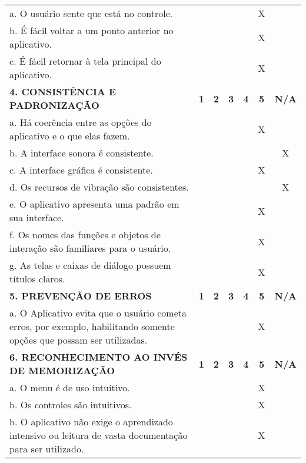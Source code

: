 \documentclass[portuguese,oneside]{tcc}
\begin{document}
\begin{center}
\begin{longtabu}{|L{25em}|c|c|c|c|c|c|}
																											a. O usuário sente que está no controle. & & & & & X & \\ 
																											b. É fácil voltar a um ponto anterior no aplicativo. & & & & & X & \\ 
																											c. É fácil retornar à tela principal do aplicativo. & & & & & X & \\ 
																											\textbf{4. CONSISTÊNCIA E PADRONIZAÇÃO} & \textbf{1} & \textbf{2} & \textbf{3} & \textbf{4} & \textbf{5} & \textbf{N/A} \\ 
																											a. Há coerência entre as opções do aplicativo e o que elas fazem. & & & & & X & \\ 
																											b. A interface sonora é consistente. & & & & & & X \\ 
																											c. A interface gráfica é consistente. & & & & & X & \\ 
																											d. Os recursos de vibração são consistentes. & & & & & & X \\ 
																											e. O aplicativo apresenta uma padrão em sua interface. & & & & & X & \\ 
																											f. Os nomes das funções e objetos de interação são familiares para o usuário. & & & & & X & \\ 
																											g. As telas e caixas de diálogo possuem títulos claros. & & & & & X & \\ 
																											\textbf{5. PREVENÇÃO DE ERROS} & \textbf{1} & \textbf{2} & \textbf{3} & \textbf{4} & \textbf{5} & \textbf{N/A} \\ 
																											a. O Aplicativo evita que o usuário cometa erros, por exemplo, habilitando somente opções que possam ser utilizadas. & & & & & X & \\ 
																											\textbf{6. RECONHECIMENTO AO INVÉS DE MEMORIZAÇÃO} & \textbf{1} & \textbf{2} & \textbf{3} & \textbf{4} & \textbf{5} & \textbf{N/A} \\ 
																											a. O  menu é de uso intuitivo. & & & & & X & \\ 
																											b. Os controles são intuitivos. & & & & & X & \\ 
																											b. O aplicativo não exige o aprendizado intensivo ou leitura de vasta documentação para ser utilizado. & & & & & X & \\ 

\end{longtabu}
\end{center}
\end{document}
